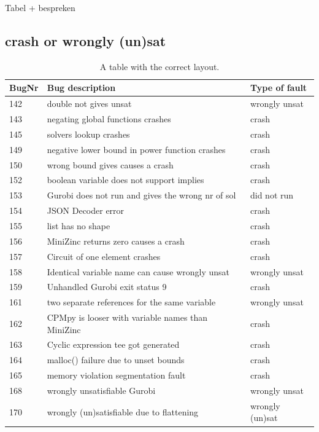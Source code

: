 Tabel + bespreken
\subsection{crash or wrongly (un)sat}
\begin{table}[]
	\centering
	\begin{tabular}{lll}
		BugNr & Bug description                                           & Type of fault   \\ \toprule
		142   & double not gives unsat                                    & wrongly unsat   \\
		143   & negating global functions crashes                         & crash           \\
		145   & solvers lookup crashes                                    & crash           \\
		149   & negative lower bound in power function crashes            & crash           \\
		150   & wrong bound gives causes a crash                          & crash           \\
		152   & boolean variable does not support implies                 & crash           \\
		153   & Gurobi does not run and gives the wrong nr of sol         & did not run     \\
		154   & JSON Decoder error                                        & crash           \\
		155   & list has no shape                                         & crash           \\
		156   & MiniZinc returns zero causes a crash                      & crash           \\
		157   & Circuit of one element crashes                            & crash           \\
		158   & Identical variable name can cause wrongly unsat           & wrongly unsat   \\
		159   & Unhandled Gurobi exit status 9                            & crash           \\
		161   & two separate references for the same variable             & wrongly unsat   \\
		162   & CPMpy is looser with variable names than MiniZinc         & crash           \\
		163   & Cyclic expression tee got generated                       & crash           \\
		164   & malloc() failure due to unset bounds                      & crash           \\
		165   & memory violation segmentation fault                       & crash           \\
		168   & wrongly unsatisfiable Gurobi                              & wrongly unsat   \\
		170   & wrongly (un)satisfiable due to flattening                 & wrongly (un)sat \\ \bottomrule
	\end{tabular}
	\caption{A table with the correct layout.}
	\label{tab:bug:fault}
\end{table}

